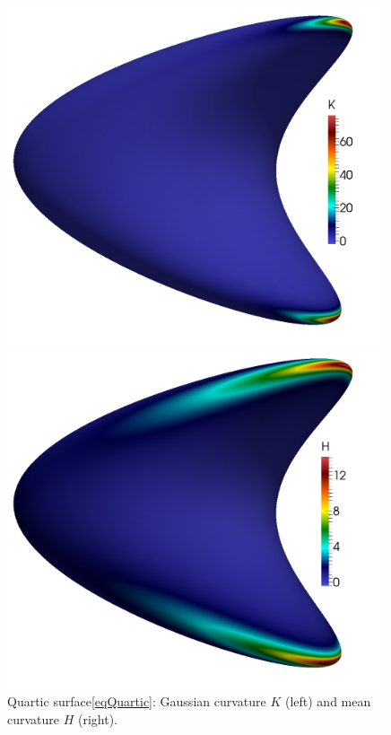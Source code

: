   \begin{figure}
    \begin{minipage}[htp]{.23\textwidth}
      \centering
      \includegraphics[width=0.99\textwidth]{bilder/quartic/K.jpg}
    \end{minipage}\hfill
    \begin{minipage}[htp]{.23\textwidth}
      \centering
      \includegraphics[width=0.99\textwidth]{bilder/quartic/H.jpg}
    \end{minipage}
    \caption{Quartic surface\eqref{eqQuartic}: Gaussian curvature \( K \) (left) and mean curvature \( H \) (right).}
    \label{figQuartic}
  \end{figure}

